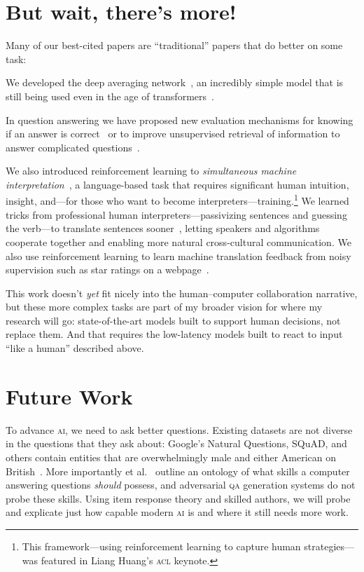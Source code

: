 \documentclass[11pt]{amsart}
\newcommand{\abr}[1]{\textsc{#1}}
\newcommand{\newcite}[2]{\capitalisewords{#1} et al.~\cite{#1-#2}}
\begin{document}
\section{But wait, there's more!}

Many of our best-cited papers are ``traditional'' papers that do
better on some task:
%
\begin{itemize*}
\item We developed the deep averaging network~\cite[\abr{dan}]{iyyer-15}, an
incredibly simple model that is still being used even in the age of
transformers~\cite{ye-22}.

\item In question answering we have proposed new evaluation mechanisms
  for knowing if an answer is correct~\cite{si-21} or to improve
  unsupervised retrieval of information to answer complicated
  questions~\cite{elgohary-19,zhao-20,shi-20}.

\item We also introduced reinforcement learning to \emph{simultaneous
machine interpretation}~\cite{Grissom:He:Boyd-Graber:Morgan-2014}, a
  language-based task that requires significant human intuition,
  insight, and---for those who want to become
  interpreters---training.\footnote{This framework---using
  reinforcement learning to capture human strategies---was featured in
  Liang Huang's \abr{acl} keynote.} We learned tricks from
  professional human interpreters---passivizing sentences and guessing
  the verb---to translate sentences sooner~\cite{He-15}, letting
  speakers and algorithms cooperate together and enabling more natural
  cross-cultural communication.  We also use reinforcement
  learning to learn machine translation feedback from noisy
  supervision such as star ratings on a webpage~\cite{nguyen-17}.
\end{itemize*}

This work doesn't \emph{yet} fit nicely into the human--computer
collaboration narrative, but these more complex tasks are part of my
broader vision for where my research will go: state-of-the-art models
built to support human decisions, not replace them.  And that requires
the low-latency models built to react to input ``like a human''
described above.

\section{Future Work}

To advance \abr{ai}, we need to ask better questions.
%
Existing datasets are not diverse in the questions that they ask
about: Google's Natural Questions, SQuAD, and others contain entities
that are overwhelmingly male and either American on
British~\cite{gor-21}.
%
More importantly \newcite{rogers}{22} outline an ontology of what
skills a computer answering questions \emph{should} possess, and
adversarial \abr{qa} generation systems do not probe these skills.
%
Using item response theory and skilled authors, we will probe and
explicate just how capable modern \abr{ai} is and where it still needs
more work.
\end{document}
